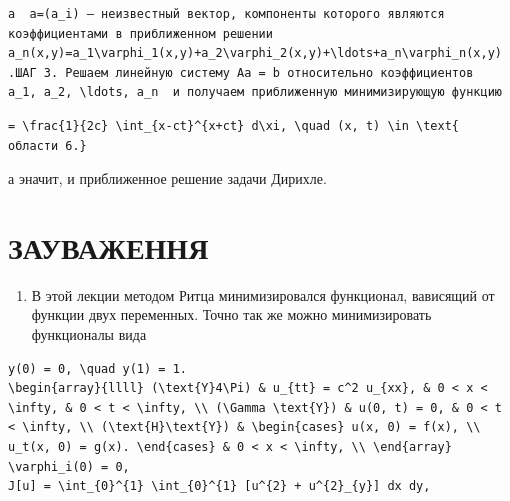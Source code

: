 \documentclass[
  ukrainian,
]{article}
\providecommand{\tightlist}{%
  \setlength{\itemsep}{0pt}\setlength{\parskip}{0pt}}
\begin{document}
\begin{verbatim}
а  a=(a_i) — неизвестный вектор, компоненты которого являются коэффициентами в приближенном решении  a_n(x,y)=a_1\varphi_1(x,y)+a_2\varphi_2(x,y)+\ldots+a_n\varphi_n(x,y) .ШАГ 3. Решаем линейную систему Aa = b относительно коэффициентов  a_1, a_2, \ldots, a_n  и получаем приближенную минимизирующую функцию
\end{verbatim}

\begin{verbatim}
= \frac{1}{2c} \int_{x-ct}^{x+ct} d\xi, \quad (x, t) \in \text{ области 6.}
\end{verbatim}

а эначит, и приближенное решение задачи Дирихле.

\section{ЗАУВАЖЕННЯ}\label{ux437ux430ux443ux432ux430ux436ux435ux43dux43dux44f}

\begin{enumerate}
\def\labelenumi{\arabic{enumi}.}
\tightlist
\item
  В этой лекции методом Ритца минимизировался функционал, вависящий от
  функции двух переменных. Точно так же можно минимизировать функционалы
  вида
\end{enumerate}

\begin{verbatim}
y(0) = 0, \quad y(1) = 1.
\begin{array}{llll} (\text{Y}4\Pi) & u_{tt} = c^2 u_{xx}, & 0 < x < \infty, & 0 < t < \infty, \\ (\Gamma \text{Y}) & u(0, t) = 0, & 0 < t < \infty, \\ (\text{H}\text{Y}) & \begin{cases} u(x, 0) = f(x), \\ u_t(x, 0) = g(x). \end{cases} & 0 < x < \infty, \\ \end{array}
\varphi_i(0) = 0,
J[u] = \int_{0}^{1} \int_{0}^{1} [u^{2} + u^{2}_{y}] dx dy,
\end{verbatim}
\end{document}
